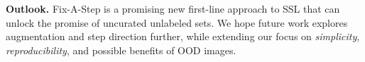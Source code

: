 \textbf{Outlook.}
Fix-A-Step is a promising new first-line approach to SSL that can unlock the promise of uncurated unlabeled sets.
We hope future work explores  augmentation and step direction further, 
while extending our focus on \emph{simplicity}, \emph{reproducibility}, and possible benefits of OOD images. 
